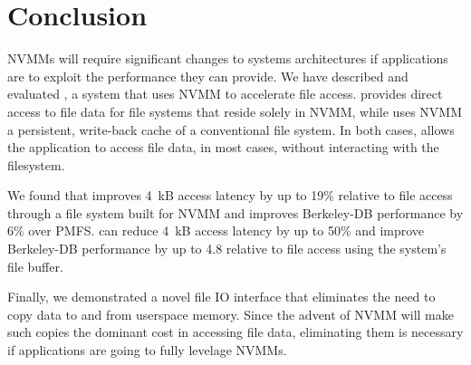 \section{Conclusion}
\label{sec:conclude}

NVMMs will require significant changes to systems architectures if applications
are to exploit the performance they can provide.  We have described and
evaluated \Chell{}, a system that uses NVMM to accelerate file access.
\DAChell{} provides direct access to file data for file systems that reside
solely in NVMM, while \CChell{} uses NVMM a persistent, write-back cache of a
conventional file system.  In both cases, \Chell{} allows the application to
access file data, in most cases, without interacting with the filesystem.

We found that \DAChell{} improves 4~kB access latency by up to 19\% relative to
file access through a file system built for NVMM and improves Berkeley-DB
performance by 6\% over PMFS.  \CChell{} can
reduce 4~kB access latency by up to 50\% and
improve Berkeley-DB performance by up to 4.8\x{} relative to file access using the
system's file buffer.

Finally, we demonstrated a novel file IO interface that eliminates the need to
copy data to and from userspace memory.  Since the advent of NVMM will make such copies the dominant cost in accessing file data, eliminating them is necessary if applications are going to fully levelage NVMMs.

